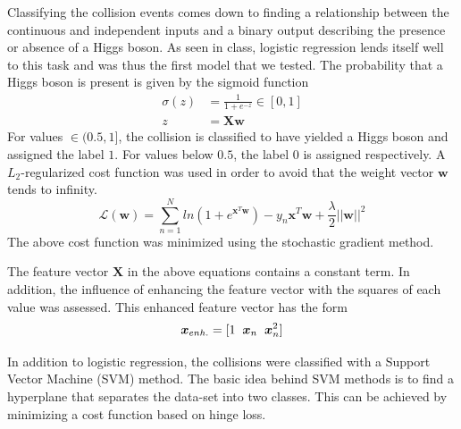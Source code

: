 \documentclass[10pt,conference,compsocconf]{IEEEtran}
\begin{document}
\par
Classifying the collision events comes down to finding a relationship between the continuous and independent inputs and a binary output describing the presence or absence of a Higgs boson. As seen in class, logistic regression lends itself well to this task and was thus the first model that we tested. 
The probability that a Higgs boson is present is given by the sigmoid function
\begin{align*}
\sigma(z) &= \frac{1}{1+e^{-z}} \in [0,1]\\
z & = \boldsymbol{Xw} 
\end{align*}
For values $\in (0.5,1]$, the collision is classified to have yielded a Higgs boson and assigned the label $1$. For values below $0.5$, the label $0$ is assigned respectively. A $L_2$-regularized cost function was used in order to avoid that the weight vector $\boldsymbol{w}$ tends to infinity.  
\begin{equation}
\mathcal{L}(\boldsymbol{w}) = \sum_{n=1}^N ln(1+e^{\boldsymbol{x}^T\boldsymbol{w}}) - y_n \boldsymbol{x}^T\boldsymbol{w} + \frac{\lambda}{2}||\boldsymbol{w}||^2
\end{equation}
The above cost function was minimized using the stochastic gradient method. \par
The feature vector $\boldsymbol{X}$ in the above equations contains a constant term. In addition, the influence of enhancing the feature vector with the squares of each value was assessed. This enhanced feature vector has the form
\begin{equation}
\boldsymbol{x}_{enh.} = [1 \hspace{2mm} \boldsymbol{x}_n \hspace{2mm} \boldsymbol{x}_n^2]
\end{equation}
\par
In addition to logistic regression, the collisions were classified with a Support Vector Machine (SVM) method. The basic idea behind SVM methods is to find a hyperplane that separates the data-set into two classes. This can be achieved by minimizing a cost function based on hinge loss.
\end{document}
